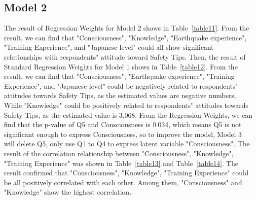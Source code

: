 
\subsection{Model 2}

The result of Regression Weights for Model 2 shows in Table~\ref{table11}. From the result, we can find that "Consciousness", "Knowledge", "Earthquake experience", "Training Experience", and "Japanese level" could all show significant relationships with respondents" attitude toward Safety Tips. Then, the result of Standard Regression Weights for Model 1 shows in Table~\ref{table12}. From the result, we can find that "Consciousness", "Earthquake experience", "Training Experience", and "Japanese level" could be negatively related to respondents" attitudes towards Safety Tips, as the estimated values are negative numbers. While "Knowledge" could be positively related to respondents" attitudes towards Safety Tips, as the estimated value is 3.068. From the  Regression Weights, we can find that the p-value of Q5 and Consciousness is 0.034, which means Q5 is not significant enough to express Consciousness, so to improve the model, Model 3 will delete Q5, only use Q1 to Q4 to express latent variable "Consciousness". The result of the correlation relationship between "Consciousness", "Knowledge", "Training Experience" was shown in Table~\ref{table13} and Table~\ref{table14}. The result confirmed that "Consciousness", "Knowledge", "Training Experience" could be all positively correlated with each other. Among them, "Consciousness" and "Knowledge" show the highest correlation. 

